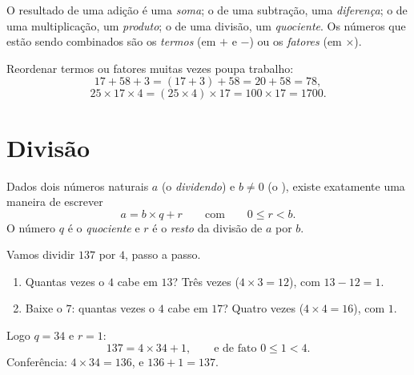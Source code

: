 \begin{remark}[Vocabulário]
O resultado de uma adição é uma \emph{soma}; o de uma
subtração, uma \emph{diferença}; o de uma multiplicação,
um \emph{produto}; o de uma divisão, um
\emph{quociente}. Os números que estão sendo combinados
são os \emph{termos} (em $+$ e $-$) ou os \emph{fatores} (em $\times$).
\end{remark}

\begin{example}\label{ex:g6:wholes:smart}
Reordenar termos ou fatores muitas vezes poupa trabalho:
\[
17 + 58 + 3 = (17 + 3) + 58 = 20 + 58 = 78 ,
\]
\[
25 \times 17 \times 4 = (25 \times 4) \times 17 = 100 \times 17 = 1700 .
\]
\end{example}

\section{Divisão}

\begin{theorem}\label{thm:g6:wholes:division}
Dados dois números naturais $a$ (o \emph{dividendo}) e $b \neq 0$ (o
\emph{}), existe exatamente uma maneira de escrever
\[
a = b \times q + r
\qquad\text{com}\qquad
0 \leq r < b .
\]
O número $q$ é o \emph{quociente} e $r$ é o
\emph{resto} da divisão de $a$ por $b$.
\end{theorem}
\admitted

\begin{example}\label{ex:g6:wholes:division}
Vamos dividir $137$ por $4$, passo a passo.
\begin{enumerate}
  \item Quantas vezes o $4$ cabe em $13$? Três vezes
        ($4 \times 3 = 12$), com  $13 - 12 = 1$.
  \item Baixe o $7$: quantas vezes o $4$ cabe em $17$? Quatro vezes
        ($4 \times 4 = 16$), com  $1$.
\end{enumerate}
Logo $q = 34$ e $r = 1$:
\[
137 = 4 \times 34 + 1, \qquad\text{e de fato } 0 \leq 1 < 4 .
\]
Conferência: $4 \times 34 = 136$, e $136 + 1 = 137$.
\end{example}

